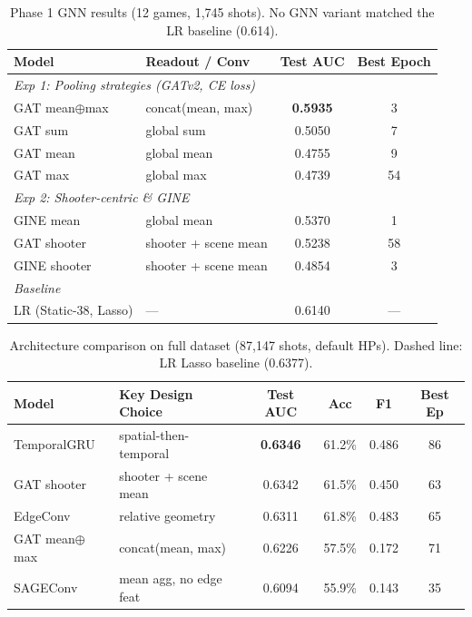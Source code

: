 \documentclass{article}
\begin{document}
\begin{table}[H]
\centering
\caption{Phase 1 GNN results (12 games, 1,745 shots). No GNN variant matched the LR baseline (0.614).}
\label{tab:phase1_results}
\small
\begin{tabular}{@{}llcc@{}}
\toprule
\textbf{Model} & \textbf{Readout / Conv} & \textbf{Test AUC} & \textbf{Best Epoch} \\
\midrule
\multicolumn{4}{l}{\emph{Exp 1: Pooling strategies (GATv2, CE loss)}} \\
GAT mean$\oplus$max & concat(mean, max) & \textbf{0.5935} & 3 \\
GAT sum & global sum & 0.5050 & 7 \\
GAT mean & global mean & 0.4755 & 9 \\
GAT max & global max & 0.4739 & 54 \\
\midrule
\multicolumn{4}{l}{\emph{Exp 2: Shooter-centric \& GINE}} \\
GINE mean & global mean & 0.5370 & 1 \\
GAT shooter & shooter + scene mean & 0.5238 & 58 \\
GINE shooter & shooter + scene mean & 0.4854 & 3 \\
\midrule
\multicolumn{4}{l}{\emph{Baseline}} \\
LR (Static-38, Lasso) & --- & 0.6140 & --- \\
\bottomrule
\end{tabular}
\end{table}

\begin{table}[H]
\centering
\caption{Architecture comparison on full dataset (87,147 shots, default HPs). Dashed line: LR Lasso baseline (0.6377).}
\label{tab:arch_comparison}
\small
\begin{tabular}{@{}llcccc@{}}
\toprule
\textbf{Model} & \textbf{Key Design Choice} & \textbf{Test AUC} & \textbf{Acc} & \textbf{F1} & \textbf{Best Ep} \\
\midrule
TemporalGRU & spatial-then-temporal & \textbf{0.6346} & 61.2\% & 0.486 & 86 \\
GAT shooter & shooter + scene mean & 0.6342 & 61.5\% & 0.450 & 63 \\
EdgeConv & relative geometry & 0.6311 & 61.8\% & 0.483 & 65 \\
GAT mean$\oplus$max & concat(mean, max) & 0.6226 & 57.5\% & 0.172 & 71 \\
SAGEConv & mean agg, no edge feat & 0.6094 & 55.9\% & 0.143 & 35 \\
\bottomrule
\end{tabular}
\end{table}
\end{document}
